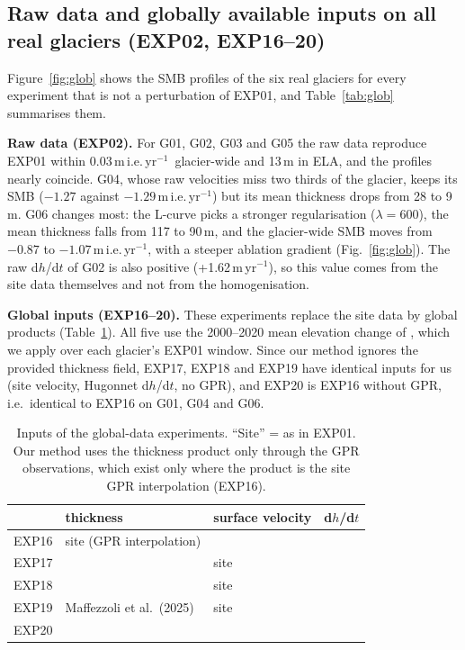 \documentclass[10pt,a4paper]{article}
\newcommand{\myr}{m\,yr$^{-1}$}
\newcommand{\mie}{m\,i.e.\,yr$^{-1}$}
\begin{document}
\subsection{Raw data and globally available inputs on all real glaciers (EXP02, EXP16--20)}
Figure~\ref{fig:glob} shows the SMB profiles of the six real glaciers for every experiment that is not a perturbation of
EXP01, and Table~\ref{tab:glob} summarises them.

\textbf{Raw data (EXP02).} For G01, G02, G03 and G05 the raw data reproduce EXP01 within 0.03\,\mie\ glacier-wide and
13\,m in ELA, and the profiles nearly coincide. G04, whose raw velocities miss two thirds of the glacier, keeps its SMB
($-1.27$ against $-1.29$\,\mie) but its mean thickness drops from 28 to 9\,m. G06 changes most: the L-curve picks a stronger
regularisation ($\lambda=600$), the mean thickness falls from 117 to 90\,m, and the glacier-wide SMB moves from $-0.87$ to
$-1.07$\,\mie, with a steeper ablation gradient (Fig.~\ref{fig:glob}). The raw d$h$/d$t$ of G02 is also positive
(+1.62\,\myr), so this value comes from the site data themselves and not from the homogenisation.

\textbf{Global inputs (EXP16--20).} These experiments replace the site data by global products (Table~\ref{tab:globin}).
All five use the 2000--2020 mean elevation change of \citet{hugonnet}, which we apply over each glacier's EXP01 window.
Since our method ignores the provided thickness field, EXP17, EXP18 and EXP19 have identical inputs for us (site velocity,
Hugonnet d$h$/d$t$, no GPR), and EXP20 is EXP16 without GPR, i.e.\ identical to EXP16 on G01, G04 and G06.

\begin{table}[!htb]
\centering\small
\caption{Inputs of the global-data experiments. ``Site'' = as in EXP01. Our method uses the thickness product only through
the GPR observations, which exist only where the product is the site GPR interpolation (EXP16).}
\label{tab:globin}
\begin{tabular}{llll}
\toprule
& thickness & surface velocity & d$h$/d$t$ \\
\midrule
EXP16 & site (GPR interpolation) & \citet{millan} & \citet{hugonnet} \\
EXP17 & \citet{farinotti} & site & \citet{hugonnet} \\
EXP18 & \citet{millan} & site & \citet{hugonnet} \\
EXP19 & Maffezzoli et al.\ (2025) & site & \citet{hugonnet} \\
EXP20 & \citet{farinotti} & \citet{millan} & \citet{hugonnet} \\
\bottomrule
\end{tabular}
\end{table}
\end{document}
